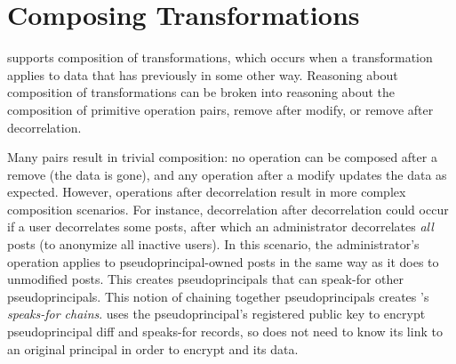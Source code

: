 \section{Composing \Xxing Transformations}
\label{s:composition}

\sys supports composition of \xxing transformations, which occurs when a
transformation applies to data that \sys has previously \xxed in
some other way.
%
Reasoning about composition of transformations can be broken into reasoning
about the composition of primitive operation pairs, \eg remove after
modify, or remove after decorrelation.
%

%
Many pairs result in trivial composition: no operation can be composed after a
remove (the data is gone), and any operation after a modify updates the
data as expected. 
%
However, operations after decorrelation result in more complex composition scenarios.
%
For instance, decorrelation after decorrelation could occur if a user
decorrelates some posts, after which an administrator decorrelates \emph{all}
posts (\eg to anonymize all inactive users). In this scenario, the administrator's \xxing operation applies to
pseudoprincipal-owned posts in the same way as it does to unmodified posts. This
creates pseudoprincipals that can speak-for other pseudoprincipals.  This notion
of chaining together pseudoprincipals creates \sys's \emph{speaks-for chains}.
\sys uses the pseudoprincipal's registered public key to encrypt pseudoprincipal
diff and speaks-for records, so \sys does not need to know its link to an
original principal in order to encrypt and \xx its data.
%

